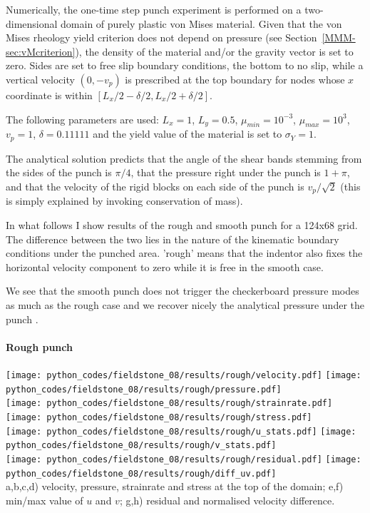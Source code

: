 Numerically, the one-time step punch experiment is performed on a two-dimensional
domain of purely plastic von Mises material. 
Given that the von Mises rheology yield criterion does not depend on pressure
(see Section~\ref{MMM-sec:vMcriterion}), the density of the material and/or the gravity 
vector is set to zero. Sides are set to free slip boundary conditions, the bottom to no slip, 
while a vertical velocity $(0,-v_p)$ is prescribed at the top boundary for nodes 
whose $x$ coordinate is within $[L_x/2-\delta/2,L_x/2+\delta/2]$. 

The following parameters are used: $L_x=1$, $L_y=0.5$, $\mu_{min}=10^{-3}$, 
$\mu_{max}=10^3$, $v_p=1$, $\delta=0.11111$ 
and the yield value of the material is set to $\sigma_Y=1$. 

The analytical solution predicts that the angle of the shear bands stemming from the sides of the punch 
is $\pi/4$, that the pressure right under the punch is $1+\pi$, 
and that the velocity of the rigid blocks on each side of the punch is $v_p/\sqrt{2}$ 
(this is simply explained by invoking conservation of mass).

In what follows I show results of the rough and smooth punch for a 124x68 grid. The difference between the two
lies in the nature of the kinematic boundary conditions under the punched area. 'rough' means that the indentor 
also fixes the horizontal velocity component to zero while it is free in the smooth case.

We see that the smooth punch does not trigger the checkerboard pressure modes as much as the rough case 
and we recover nicely the analytical pressure under the punch \cite{thfb08,gltf18}.

\newpage
\paragraph{Rough punch} 

\begin{center}
\texttt{[image: python\_codes/fieldstone\_08/results/rough/velocity.pdf]}
\texttt{[image: python\_codes/fieldstone\_08/results/rough/pressure.pdf]}\\
\texttt{[image: python\_codes/fieldstone\_08/results/rough/strainrate.pdf]}
\texttt{[image: python\_codes/fieldstone\_08/results/rough/stress.pdf]}\\
\texttt{[image: python\_codes/fieldstone\_08/results/rough/u\_stats.pdf]}
\texttt{[image: python\_codes/fieldstone\_08/results/rough/v\_stats.pdf]}\\
\texttt{[image: python\_codes/fieldstone\_08/results/rough/residual.pdf]}
\texttt{[image: python\_codes/fieldstone\_08/results/rough/diff\_uv.pdf]}\\
{\captionfont a,b,c,d) velocity, pressure, strainrate and stress at the top of the domain; 
e,f) min/max value of $u$ and $v$;
g,h) residual and normalised velocity difference.}
\end{center}

